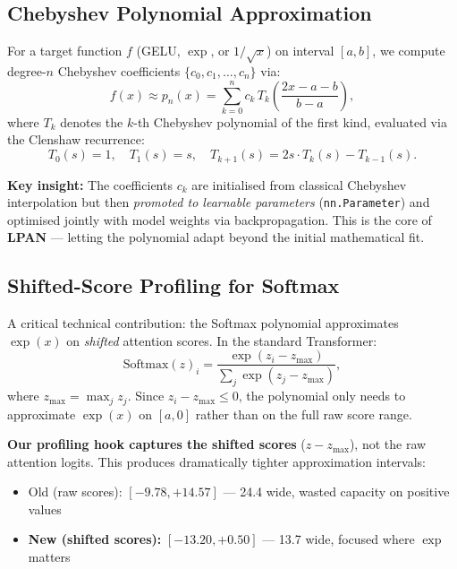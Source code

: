 \documentclass[12pt, a4paper]{article}
\begin{document}
\subsection{Chebyshev Polynomial Approximation}

For a target function $f$ (GELU, $\exp$, or $1/\sqrt{x}$) on interval $[a, b]$, we compute degree-$n$ Chebyshev coefficients $\{c_0, c_1, \ldots, c_n\}$ via:
\begin{equation}
  f(x) \approx p_n(x) = \sum_{k=0}^{n} c_k \, T_k\!\left(\frac{2x - a - b}{b - a}\right),
  \label{eq:cheb_approx}
\end{equation}
where $T_k$ denotes the $k$-th Chebyshev polynomial of the first kind, evaluated via the Clenshaw recurrence:
\begin{equation}
  T_0(s) = 1, \quad T_1(s) = s, \quad T_{k+1}(s) = 2s \cdot T_k(s) - T_{k-1}(s).
  \label{eq:clenshaw}
\end{equation}

\textbf{Key insight:} The coefficients $c_k$ are initialised from classical Chebyshev interpolation but then \emph{promoted to learnable parameters} (\texttt{nn.Parameter}) and optimised jointly with model weights via backpropagation. This is the core of \textbf{LPAN} --- letting the polynomial adapt beyond the initial mathematical fit.

\subsection{Shifted-Score Profiling for Softmax}

A critical technical contribution: the Softmax polynomial approximates $\exp(x)$ on \emph{shifted} attention scores. In the standard Transformer:
\begin{equation}
  \text{Softmax}(z)_i = \frac{\exp(z_i - z_{\max})}{\sum_j \exp(z_j - z_{\max})},
  \label{eq:softmax_shifted}
\end{equation}
where $z_{\max} = \max_j z_j$. Since $z_i - z_{\max} \leq 0$, the polynomial only needs to approximate $\exp(x)$ on $[a, 0]$ rather than on the full raw score range.

\textbf{Our profiling hook captures the shifted scores} ($z - z_{\max}$), not the raw attention logits. This produces dramatically tighter approximation intervals:
\begin{itemize}[leftmargin=2em]
  \item Old (raw scores): $[-9.78, +14.57]$ --- 24.4 wide, wasted capacity on positive values
  \item \textbf{New (shifted scores):} $[-13.20, +0.50]$ --- 13.7 wide, focused where $\exp$ matters
\end{itemize}
\end{document}
